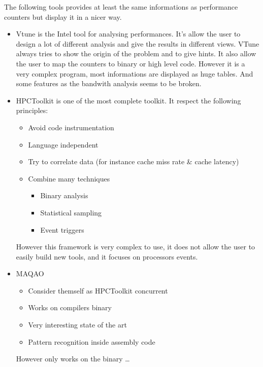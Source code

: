 The following tools provides at least the same informations as performance
counters but display it in a nicer way.
\begin{itemize}
    \item Vtune \cite{Reinders05VTune} is the Intel tool for analysing
        performances. It's allow the user to design a lot of different
        analysis and give the results in different views. VTune always tries
        to show the origin of the problem and to give hints. It also allow the
        user to map the counters to binary or high level code. However it is a
        very complex program, most informations are displayed as huge tables.
        And some features as the bandwith analysis seems to be broken.
    \item HPCToolkit \cite{Adhianto10HPCTOOLKIT} is one of the most complete
        toolkit. It respect the following principles:
        \begin{itemize}
            \item Avoid code instrumentation
            \item Language independent
            \item Try to correlate data (for instance cache miss rate \&
                cache latency)
            \item Combine many techniques
                \begin{itemize}
                    \item Binary analysis
                    \item Statistical sampling
                    \item Event triggers
                \end{itemize}
        \end{itemize}
        However this framework is very complex to use, it does not allow the
        user to easily build new tools, and it focuses on processors events.
    \item MAQAO \cite{Djoudi05MAQAO}
        \begin{itemize}
            \item Consider themself as HPCToolkit concurrent
            \item Works on compilers binary
            \item Very interesting state of the art
            \item Pattern recognition inside assembly code
        \end{itemize}
        However only works on the binary \dots

\end{itemize}
